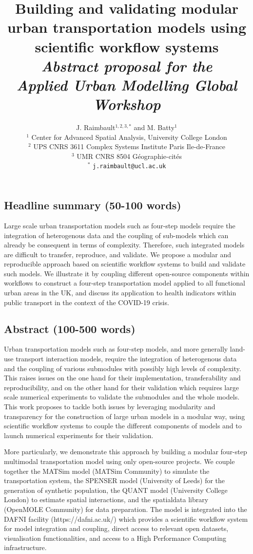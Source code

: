 \documentclass[10pt]{article}
\title{\vspace{-3cm}Building and validating modular urban transportation models using scientific workflow systems\medskip\\
\large\textit{Abstract proposal for the}\\
\textit{Applied Urban Modelling Global Workshop}
}
\author{J. Raimbault$^{1,2,3,\ast}$ and M. Batty$^{1}$\medskip\\
$^{1}$ Center for Advanced Spatial Analysis, University College London\\
$^{2}$ UPS CNRS 3611 Complex Systems Institute Paris Ile-de-France\\
$^{3}$ UMR CNRS 8504 G{\'e}ographie-cit{\'e}s\medskip\\
$^{\ast}$ \texttt{j.raimbault@ucl.ac.uk}
}
\date{}
\begin{document}
\maketitle

\subsection*{Headline summary (50-100 words)}

Large scale urban transportation models such as four-step models require the integration of heterogenous data and the coupling of sub-models which can already be consequent in terms of complexity. Therefore, such integrated models are difficult to transfer, reproduce, and validate. We propose a modular and reproducible approach based on scientific workflow systems to build and validate such models. We illustrate it by coupling different open-source components within workflows to construct a four-step transportation model applied to all functional urban areas in the UK, and discuss its application to health indicators within public transport in the context of the COVID-19 crisis.


\subsection*{Abstract (100-500 words)}

Urban transportation models such as four-step models, and more generally land-use transport interaction models, require the integration of heterogenous data and the coupling of various submodules with possibly high levels of complexity. This raises issues on the one hand for their implementation, transferability and reproducibility, and on the other hand for their validation which requires large scale numerical experiments to validate the submodules and the whole models. This work proposes to tackle both issues by leveraging modularity and transparency for the construction of large urban models in a modular way, using scientific workflow systems to couple the different components of models and to launch numerical experiments for their validation.

More particularly, we demonstrate this approach by building a modular four-step multimodal transportation model using only open-source projects. We couple together the MATSim model (MATSim Community) to simulate the transportation system, the SPENSER model (University of Leeds) for the generation of synthetic population, the QUANT model (University College London) to estimate spatial interactions, and the spatialdata library (OpenMOLE Community) for data preparation. The model is integrated into the DAFNI facility (https://dafni.ac.uk/) which provides a scientific workflow system for model integration and coupling, direct access to relevant open datasets, visualisation functionalities, and access to a High Performance Computing infrastructure.
\end{document}
